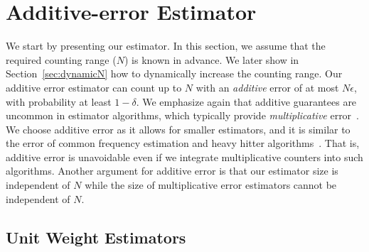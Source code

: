 \section{Additive-error Estimator}

We start by presenting our estimator.  
In this section, we assume that the required counting range ($N$) is known in advance. 
We later show in Section~\ref{sec:dynamicN} how to dynamically increase the counting range. 
Our additive error estimator can count up to $N$ with an \emph{additive} error of at most $N\epsilon$, with probability at least $1-\delta$. 
We emphasize again that additive guarantees are uncommon in estimator algorithms, which typically provide \emph{multiplicative} error~\cite{ICE-Buckets,CASE,ANLSUpscaling,DISCO}.
We choose additive error as it allows for smaller estimators, and it is similar to the error of common frequency estimation and heavy hitter algorithms~\cite{SpaceSavings,CountMinSketch}. That is,
additive error is unavoidable even if we integrate multiplicative counters into such algorithms. Another argument for additive error is that our estimator size is independent of $N$ while the size of multiplicative error estimators cannot be independent of $N$. 

\subsection{Unit Weight Estimators}
\label{sec:single}

